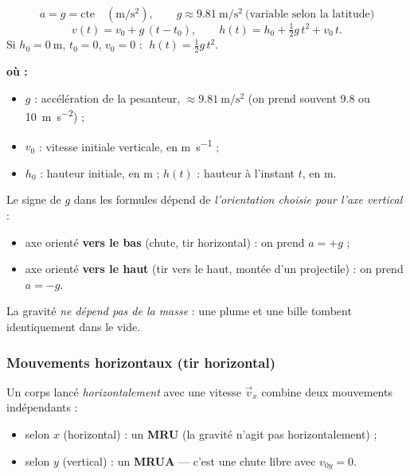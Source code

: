 \documentclass[11pt,a4paper]{article}
\newenvironment{ou}{%
  \par\smallskip\noindent\textbf{où :}\nopagebreak
  \begin{itemize}[leftmargin=1.8em,topsep=2pt,itemsep=1.5pt,parsep=0pt]}%
  {\end{itemize}}
\newcommand{\vv}[1]{\vec{#1}}
\newcommand{\mss}{\si{\metre\per\second\squared}}
\begin{document}
\begin{formule}
\[ a=g=\text{cte}\quad(\mss),\qquad g\approx\qty{9,81}{\metre\per\second\squared}\ \text{(variable selon la latitude)} \]
\[ \boxed{v(t)=v_0+g\,(t-t_0)},\qquad
   \boxed{h(t)=h_0+\tfrac12 g\,t^2+v_0\,t}. \]
Si $h_0=\qty{0}{\metre}$, $t_0=0$, $v_0=0$ : $\;\boxed{h(t)=\tfrac12 g\,t^2}$.
\begin{ou}
  \item $g$ : accélération de la pesanteur, $\approx\qty{9,81}{\metre\per\second\squared}$ (on prend souvent \qty{9,8}{} ou \qty{10}{\metre\per\second\squared}) ;
  \item $v_0$ : vitesse initiale verticale, en \si{\metre\per\second} ;
  \item $h_0$ : hauteur initiale, en \si{\metre} ; \quad $h(t)$ : hauteur à l'instant $t$, en \si{\metre}.
\end{ou}
\end{formule}

\begin{attention}
Le signe de $g$ dans les formules dépend de \emph{l'orientation choisie pour l'axe vertical} :
\begin{itemize}[leftmargin=1.6em,topsep=2pt]
  \item axe orienté \textbf{vers le bas} (chute, tir horizontal) : on prend $a=+g$ ;
  \item axe orienté \textbf{vers le haut} (tir vers le haut, montée d'un projectile) : on prend $a=-g$.
\end{itemize}
La gravité \emph{ne dépend pas de la masse} : une plume et une bille tombent identiquement dans le vide.
\end{attention}

\subsubsection{Mouvements horizontaux (tir horizontal)}

Un corps lancé \emph{horizontalement} avec une vitesse $\vv{v}_x$ combine deux mouvements indépendants :
\begin{itemize}[leftmargin=1.6em,topsep=2pt]
  \item selon $x$ (horizontal) : un \textbf{MRU} (la gravité n'agit pas horizontalement) ;
  \item selon $y$ (vertical) : un \textbf{MRUA} — c'est une chute libre avec $v_{0y}=0$.
\end{itemize}
\end{document}
